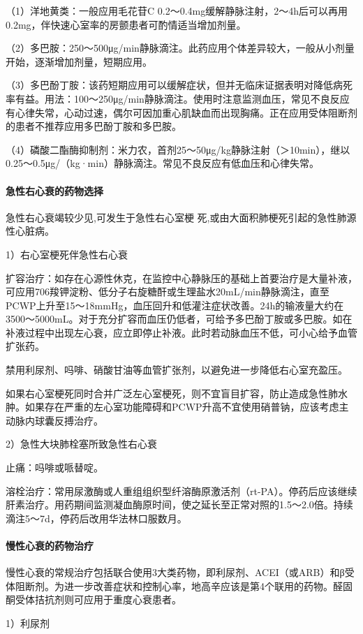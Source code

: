 （1）洋地黄类：一般应用毛花苷C
0.2～0.4mg缓解静脉注射，2～4h后可以再用0.2mg，伴快速心室率的房颤患者可酌情适当增加剂量。

（2）多巴胺：250～500μg/min静脉滴注。此药应用个体差异较大，一般从小剂量开始，逐渐增加剂量，短期应用。

（3）多巴酚丁胺：该药短期应用可以缓解症状，但并无临床证据表明对降低病死率有益。用法：100～250μg/min静脉滴注。使用时注意监测血压，常见不良反应有心律失常，心动过速，偶尔可因加重心肌缺血而出现胸痛。正在应用受体阻断剂的患者不推荐应用多巴酚丁胺和多巴胺。

（4）磷酸二酯酶抑制剂：米力农，首剂25～50μg/kg静脉注射（＞10min），继以0.25～0.5μg/（kg·min）静脉滴注。常见不良反应有低血压和心律失常。
\paragraph{急性右心衰的药物选择}
急性右心衰竭较少见,可发生于急性右心室梗
死,或由大面积肺梗死引起的急性肺源性心脏病。 

1）右心室梗死伴急性右心衰

扩容治疗：如存在心源性休克，在监控中心静脉压的基础上首要治疗是大量补液，可应用706羧钾淀粉、低分子右旋糖酐或生理盐水20mL/min静脉滴注，直至PCWP上升至15～18mmHg，血压回升和低灌注症状改善。24h的输液量大约在3500～5000mL。对于充分扩容而血压仍低者，可给予多巴酚丁胺或多巴胺。如在补液过程中出现左心衰，应立即停止补液。此时若动脉血压不低，可小心给予血管扩张药。

禁用利尿剂、吗啡、硝酸甘油等血管扩张剂，以避免进一步降低右心室充盈压。

如果右心室梗死同时合并广泛左心室梗死，则不宜盲目扩容，防止造成急性肺水肿。如果存在严重的左心室功能障碍和PCWP升高不宜使用硝普钠，应该考虑主动脉内球囊反搏治疗。

2）急性大块肺栓塞所致急性右心衰

止痛：吗啡或哌替啶。

溶栓治疗：常用尿激酶或人重组组织型纤溶酶原激活剂（rt-PA）。停药后应该继续肝素治疗。用药期间监测凝血酶原时间，使之延长至正常对照的1.5～2.0倍。持续滴注5～7d，停药后改用华法林口服数月。
\paragraph{慢性心衰的药物治疗}

慢性心衰的常规治疗包括联合使用3大类药物，即利尿剂、ACEI（或ARB）和β受体阻断剂。为进一步改善症状和控制心率，地高辛应该是第4个联用的药物。醛固酮受体拮抗剂则可应用于重度心衰患者。

1）利尿剂

